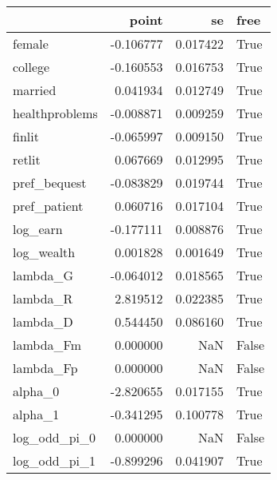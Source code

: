 \begin{tabular}{lrrl}
\toprule
{} &     point &        se &   free \\
\midrule
female         & -0.106777 &  0.017422 &   True \\
college        & -0.160553 &  0.016753 &   True \\
married        &  0.041934 &  0.012749 &   True \\
healthproblems & -0.008871 &  0.009259 &   True \\
finlit         & -0.065997 &  0.009150 &   True \\
retlit         &  0.067669 &  0.012995 &   True \\
pref\_bequest   & -0.083829 &  0.019744 &   True \\
pref\_patient   &  0.060716 &  0.017104 &   True \\
log\_earn       & -0.177111 &  0.008876 &   True \\
log\_wealth     &  0.001828 &  0.001649 &   True \\
lambda\_G       & -0.064012 &  0.018565 &   True \\
lambda\_R       &  2.819512 &  0.022385 &   True \\
lambda\_D       &  0.544450 &  0.086160 &   True \\
lambda\_Fm      &  0.000000 &       NaN &  False \\
lambda\_Fp      &  0.000000 &       NaN &  False \\
alpha\_0        & -2.820655 &  0.017155 &   True \\
alpha\_1        & -0.341295 &  0.100778 &   True \\
log\_odd\_pi\_0   &  0.000000 &       NaN &  False \\
log\_odd\_pi\_1   & -0.899296 &  0.041907 &   True \\
\bottomrule
\end{tabular}
